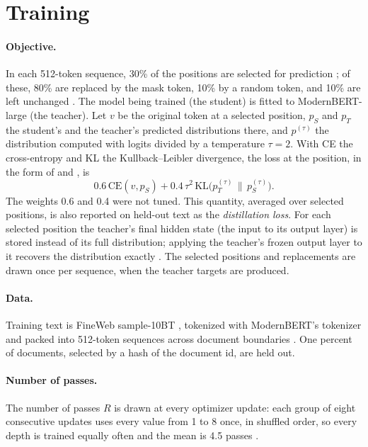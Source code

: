 \documentclass[11pt]{article}
\begin{document}
\section{Training}
\label{sec:training}

\paragraph{Objective.}
In each 512-token sequence, 30\% of the positions are selected for prediction \citep{wettig2023mask,warner2024modernbert}; of these, 80\% are
replaced by the mask token, 10\% by a random token, and 10\% are left unchanged \citep{devlin2019bert}. The model being trained (the student) is
fitted to ModernBERT-large (the teacher). Let $v$ be the original token at a selected position, $p_S$ and $p_T$ the student's and the teacher's
predicted distributions there, and $p^{(\tau)}$ the distribution computed with logits divided by a temperature $\tau = 2$. With CE the
cross-entropy and KL the Kullback--Leibler divergence, the loss at the position, in the form of
\citet{hinton2015distilling} and \citet{sanh2019distilbert}, is
\begin{equation}
0.6\,\mathrm{CE}(v, p_S) + 0.4\,\tau^2\,\mathrm{KL}\big(p_T^{(\tau)} \,\big\|\, p_S^{(\tau)}\big).
\end{equation} The weights 0.6 and 0.4 were not tuned. This quantity, averaged over selected positions, is
also reported on held-out text as the \emph{distillation loss}. For each selected position the teacher's final hidden state (the input to its
output layer) is stored instead of its full distribution; applying the teacher's frozen output layer to it recovers the distribution exactly
\citep{anshumann2025sparse}. The selected positions and replacements are drawn once per sequence, when the teacher targets are produced.

\paragraph{Data.}
Training text is FineWeb sample-10BT \citep{penedo2024fineweb}, tokenized with ModernBERT's tokenizer and packed into 512-token sequences across
document boundaries \citep{liu2019roberta}. One percent of documents, selected by a hash of the document id, are held out.

\paragraph{Number of passes.}
The number of passes $R$ is drawn at every optimizer update: each group of eight consecutive updates uses every value from 1 to 8 once, in shuffled order, so every
depth is trained equally often and the mean is 4.5 passes \citep{geiping2025recurrent,huang2016stochastic}.
\end{document}
